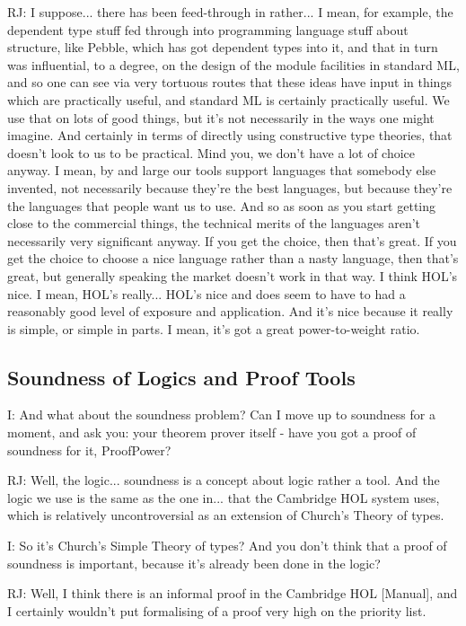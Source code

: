 \documentclass[10pt,titlepage]{book}
\begin{document}
RJ: I suppose... there has been feed-through in rather... I mean, for example, the dependent type stuff fed through into programming language stuff about structure, like Pebble, which has got dependent types into it, and that in turn was influential, to a degree, on the design of the module facilities in standard ML, and so one can see via very tortuous routes that these ideas have input in things which are practically useful, and standard ML is certainly practically useful.
We use that on lots of good things, but it's not necessarily in the ways one might imagine.
And certainly in terms of directly using constructive type theories, that doesn't look to us to be practical.
Mind you, we don't have a lot of choice anyway.
I mean, by and large our tools support languages that somebody else invented, not necessarily because they're the best languages, but because they're the languages that people want us to use.
And so as soon as you start getting close to the commercial things, the technical merits of the languages aren't necessarily very significant anyway.
If you get the choice, then that's great.
If you get the choice to choose a nice language rather than a nasty language, then that's great, but generally speaking the market doesn't work in that way.
I think HOL's nice.
I mean, HOL's really... HOL's nice and does seem to have to had a reasonably good level of exposure and application.
And it's nice because it really is simple, or simple in parts.
I mean, it's got a great power-to-weight ratio.

\subsection{Soundness of Logics and Proof Tools}

I: And what about the soundness problem?
Can I move up to soundness for a moment, and ask you: your theorem prover itself - have you got a proof of soundness for it, ProofPower?

RJ: Well, the logic... soundness is a concept about logic rather a tool.
And the logic we use is the same as the one in... that the Cambridge HOL system uses, which is relatively uncontroversial as an extension of Church's Theory of types.

I: So it's Church's Simple Theory of types?
And you don't think that a proof of soundness is important, because it's already been done in the logic?

RJ: Well, I think there is an informal proof in the Cambridge HOL [Manual], and I certainly wouldn't put formalising of a proof very high on the priority list.
\end{document}
